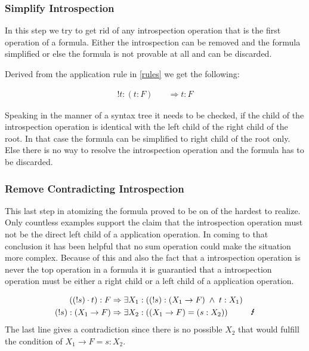

\subsubsection{Simplify Introspection}
In this step we try to get rid of any introspection operation that is the first operation of a formula. Either the introspection can be removed and the formula simplified or else the formula is not provable at all and can be discarded.

Derived from the application rule in \ref{rules} we get the following:

\begin{align}\label{sb}
	!t:(t:F) \quad & \Rightarrow t: F
\end{align}



Speaking in the manner of a syntax tree it needs to be checked, if the child of the introspection operation is identical with the left child of the right child of the root. In that case the formula can be simplified to right child of the root only. Else there is no way to resolve the introspection operation and the formula has to be discarded.

\subsubsection{Remove Contradicting Introspection}
This last step in atomizing the formula proved to be on of the hardest to realize. Only countless examples support the claim that the introspection operation must not be the direct left child of a application operation. In coming to that conclusion it has been helpful that no sum operation could make the situation more complex. Because of this and also the fact that a introspection operation is never the top operation in a formula it is guarantied that a introspection operation must be either a right child or a left child of a application operation.

\begin{align}\label{bb}
	((!s)\cdot t):F  & \Rightarrow \exists X_1 : ((!s): (X_1 \rightarrow F) \; \land \; t: X_1)\\
	(!s): (X_1 \rightarrow F)  &\Rightarrow \exists X_2 : ((X_1 \rightarrow F) = (s:X_2)) & \text{\Lightning}
\end{align}
The last line gives a contradiction since there is no possible $X_2$ that would fulfill the condition of $X_1 \rightarrow F = s:X_2$.

